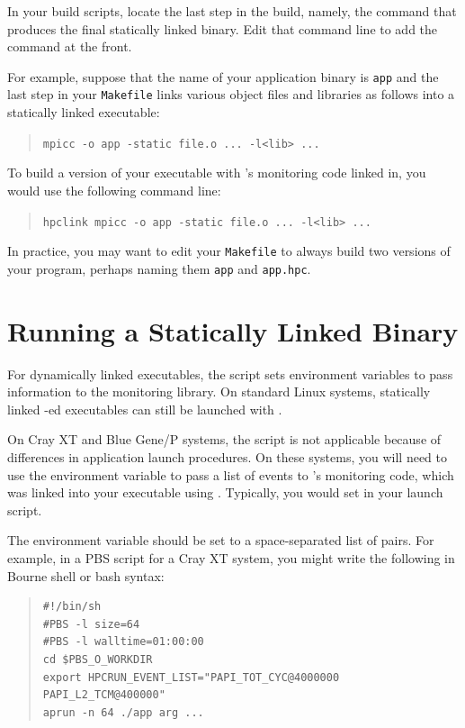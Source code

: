 \documentclass[11pt,letterpaper]{report}
\begin{document}
In your build scripts, locate the last step in the build, namely, the command that produces the final statically linked binary.
Edit that command line to add the \hpclink{} command at the front.

For example, suppose that the name of your application binary is \texttt{app} and the last step in
your \texttt{Makefile} links various object files and libraries as
follows into a statically linked executable:
\begin{quote}
  \verb|mpicc -o app -static file.o ... -l<lib> ...|
\end{quote}
To build a version of your executable with \HPCToolkit's monitoring code linked in, you would use the following command line:
\begin{quote}
  \verb|hpclink mpicc -o app -static file.o ... -l<lib> ...|
\end{quote}

In practice, you may want to edit your \texttt{Makefile} to always build two versions of your program, perhaps naming them \texttt{app} and \texttt{app.hpc}.


\section{Running a Statically Linked Binary}

For dynamically linked executables, the \hpcrun{} script sets environment variables to pass information to the \HPCToolkit{} monitoring library.
On standard Linux systems, statically linked \hpclink{}-ed executables can still be launched with \hpcrun{}.

On Cray XT and Blue Gene/P systems, the \hpcrun{} script is not applicable because of differences in application launch procedures.
On these systems, you will need to use the  environment variable to pass a list of events to \HPCToolkit{}'s monitoring code, which was linked into your executable using \hpclink{}.
Typically, you would set  in your launch script.

The  environment variable should be set to a space-separated list of  pairs.
For example, in a PBS script for a Cray XT system, you might write the following in Bourne shell or bash syntax:
\begin{quote}
\begin{verbatim}
#!/bin/sh
#PBS -l size=64
#PBS -l walltime=01:00:00
cd $PBS_O_WORKDIR
export HPCRUN_EVENT_LIST="PAPI_TOT_CYC@4000000 PAPI_L2_TCM@400000"
aprun -n 64 ./app arg ...
\end{verbatim}
\end{quote}
\end{document}
